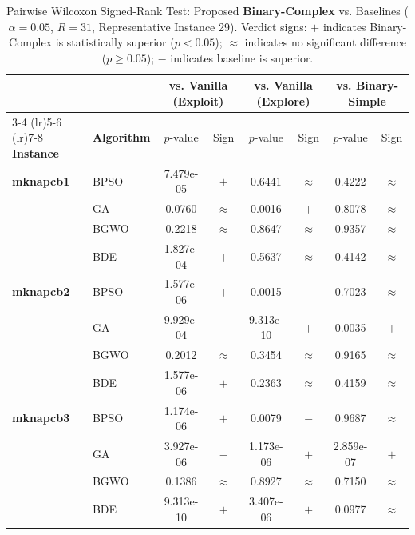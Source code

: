 \begin{table}[htbp]
  \centering
  \small
  \caption{Pairwise Wilcoxon Signed-Rank Test: Proposed \textbf{Binary-Complex} vs. Baselines ($\alpha=0.05$, $R=31$, Representative Instance 29). Verdict signs: $+$ indicates Binary-Complex is statistically superior ($p < 0.05$); $\approx$ indicates no significant difference ($p \ge 0.05$); $-$ indicates baseline is superior.}
  \label{tab:wilcoxon_inst29}
  \begin{tabular*}{\textwidth}{@{\extracolsep{\fill}}llcccccc@{}}
    \toprule
    & & \multicolumn{2}{c}{\textbf{vs. Vanilla (Exploit)}} & \multicolumn{2}{c}{\textbf{vs. Vanilla (Explore)}} & \multicolumn{2}{c}{\textbf{vs. Binary-Simple}} \\
    \cmidrule(lr){3-4} \cmidrule(lr){5-6} \cmidrule(lr){7-8}
    \textbf{Instance} & \textbf{Algorithm} & $p$-value & Sign & $p$-value & Sign & $p$-value & Sign \\
    \midrule
    \textbf{mknapcb1}  & BPSO  & 7.479e-05 & $+$ &    0.6441 & $\approx$ &    0.4222 & $\approx$ \\
                       & GA    &    0.0760 & $\approx$ &    0.0016 & $+$ &    0.8078 & $\approx$ \\
                       & BGWO  &    0.2218 & $\approx$ &    0.8647 & $\approx$ &    0.9357 & $\approx$ \\
                       & BDE   & 1.827e-04 & $+$ &    0.5637 & $\approx$ &    0.4142 & $\approx$ \\
    \midrule
    \textbf{mknapcb2}  & BPSO  & 1.577e-06 & $+$ &    0.0015 & $-$ &    0.7023 & $\approx$ \\
                       & GA    & 9.929e-04 & $-$ & 9.313e-10 & $+$ &    0.0035 & $+$ \\
                       & BGWO  &    0.2012 & $\approx$ &    0.3454 & $\approx$ &    0.9165 & $\approx$ \\
                       & BDE   & 1.577e-06 & $+$ &    0.2363 & $\approx$ &    0.4159 & $\approx$ \\
    \midrule
    \textbf{mknapcb3}  & BPSO  & 1.174e-06 & $+$ &    0.0079 & $-$ &    0.9687 & $\approx$ \\
                       & GA    & 3.927e-06 & $-$ & 1.173e-06 & $+$ & 2.859e-07 & $+$ \\
                       & BGWO  &    0.1386 & $\approx$ &    0.8927 & $\approx$ &    0.7150 & $\approx$ \\
                       & BDE   & 9.313e-10 & $+$ & 3.407e-06 & $+$ &    0.0977 & $\approx$ \\

\end{tabular*}
\end{table}

